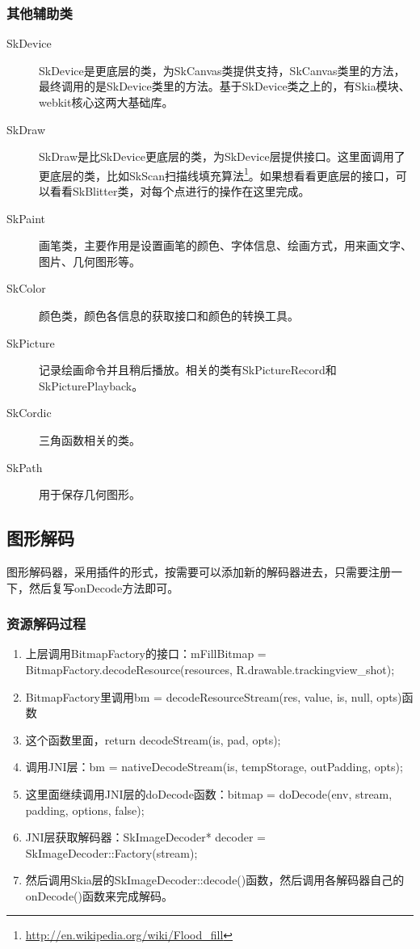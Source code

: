 \subsubsection{其他辅助类}
\label{sec:skia-others}
\begin{description}
  \item[SkDevice] SkDevice是更底层的类，为SkCanvas类提供支持，SkCanvas类里的方法，最终调用的是SkDevice类里的方法。基于SkDevice类之上的，有Skia模块、webkit核心这两大基础库。
  \item[SkDraw] SkDraw是比SkDevice更底层的类，为SkDevice层提供接口。这里面调用了更底层的类，比如SkScan扫描线填充算法\footnote{\url{http://en.wikipedia.org/wiki/Flood\_fill}}。如果想看看更底层的接口，可以看看SkBlitter类，对每个点进行的操作在这里完成。
  \item[SkPaint] 画笔类，主要作用是设置画笔的颜色、字体信息、绘画方式，用来画文字、图片、几何图形等。
  \item[SkColor] 颜色类，颜色各信息的获取接口和颜色的转换工具。
  \item[SkPicture] 记录绘画命令并且稍后播放。相关的类有SkPictureRecord和SkPicturePlayback。
  \item[SkCordic] 三角函数相关的类。
  \item[SkPath] 用于保存几何图形。
\end{description}

\subsection{图形解码}
\label{sec:skia-image}
图形解码器，采用插件的形式，按需要可以添加新的解码器进去，只需要注册一下，然后复写onDecode方法即可。

\subsubsection{资源解码过程}
\label{sec:skia-decode-res}

\begin{enumerate}
\item 上层调用BitmapFactory的接口：mFillBitmap = BitmapFactory.decodeResource(resources, R.\-drawable.\-trackingview\_shot);
\item BitmapFactory里调用bm = decodeResourceStream(res, value, is, null, opts)函数
\item 这个函数里面，return decodeStream(is, pad, opts);
\item 调用JNI层：bm = nativeDecodeStream(is, tempStorage, outPadding, opts);
\item 这里面继续调用JNI层的doDecode函数：bitmap = doDecode(env, stream, padding, options, false);
\item JNI层获取解码器：SkImageDecoder* decoder = SkImageDecoder::Factory(stream);
\item 然后调用Skia层的SkImageDecoder::decode()函数，然后调用各解码器自己的onDecode()函数来完成解码。
\end{enumerate}

